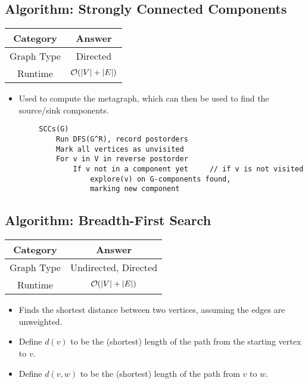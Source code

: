 \documentclass[letterpaper]{article}
\begin{document}
\subsection{Algorithm: Strongly Connected Components}
\begin{center}
    \begin{tabular}{|c|c|}
        \hline 
        \textbf{Category} & \textbf{Answer} \\ 
        \hline 
        Graph Type & Directed \\ 
        Runtime & $\mathcal{O}(|V| + |E|)$ \\ 
        \hline 
    \end{tabular}
\end{center}

\begin{itemize}
    \item Used to compute the metagraph, which can then be used to find the source/sink components. 
\end{itemize}

\begin{mdframed}[]
    \begin{verbatim}
        SCCs(G)
            Run DFS(G^R), record postorders
            Mark all vertices as unvisited 
            For v in V in reverse postorder 
                If v not in a component yet     // if v is not visited 
                    explore(v) on G-components found,
                    marking new component \end{verbatim}
\end{mdframed}

\subsection{Algorithm: Breadth-First Search}
\begin{center}
    \begin{tabular}{|c|c|}
        \hline 
        \textbf{Category} & \textbf{Answer} \\ 
        \hline 
        Graph Type & Undirected, Directed \\ 
        Runtime & $\mathcal{O}(|V| + |E|)$ \\ 
        \hline 
    \end{tabular}
\end{center}

\begin{itemize}
    \item Finds the shortest distance between two vertices, assuming the edges are unweighted.
    \item Define $d(v)$ to be the (shortest) length of the path from the starting vertex to $v$. 
    \item Define $d(v, w)$ to be the (shortest) length of the path from $v$ to $w$. 
\end{itemize}
\end{document}
